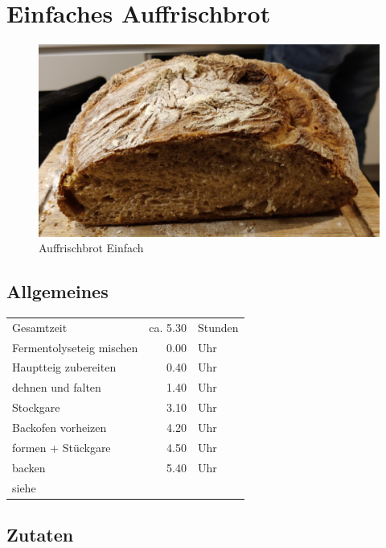 \section{Einfaches Auffrischbrot}  
\begin{figure}[H]
    \centering
    \includegraphics[width=0.7\linewidth]{Bilder/AuffrischbrotEinfach}
    \caption{Auffrischbrot Einfach}
    \label{fig:auffrischbroteinfach}
\end{figure}

\subsection*{Allgemeines}
\begin{tabular}{lrl}
    Gesamtzeit               &              ca. 5.30 & Stunden \\
    Fermentolyseteig mischen &                  0.00 & Uhr     \\
    Hauptteig zubereiten     &                  0.40 & Uhr     \\
    dehnen und falten        &                  1.40 & Uhr     \\
    Stockgare                &                  3.10 & Uhr     \\
    Backofen vorheizen       &                  4.20 & Uhr     \\
    formen + Stückgare       &                  4.50 & Uhr     \\
    backen                   &                  5.40 & Uhr     \\
    siehe                    & \cite[124]{SonjaBauer2021} &
\end{tabular}

\subsection*{Zutaten}

